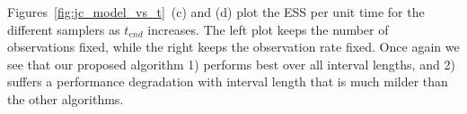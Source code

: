   Figures~\ref{fig:jc_model_vs_t}~(c) and (d) plot the ESS per unit time for the
  different samplers as $t_{end}$ increases. 
  The left plot keeps the number of observations fixed, while the right keeps the observation rate fixed. 
Once again we see that our proposed algorithm
1) performs best over all interval lengths, and 2) suffers a performance
degradation with interval length that is much milder than the other algorithms.

